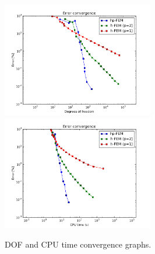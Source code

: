\begin{figure}[!ht]
\centering
\includegraphics[height=5cm]{nist/nist-4/conv_dof_aniso.png}\ \
\includegraphics[height=5cm]{nist/nist-4/conv_cpu_aniso.png}
\caption{DOF and CPU time convergence graphs.}
\label{fig:nist-4-conv}
\end{figure}

